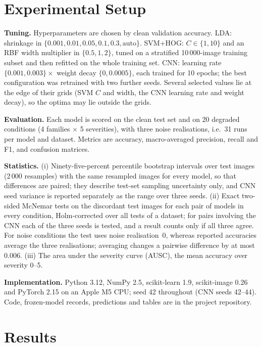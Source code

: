 \documentclass[conference]{IEEEtran}
\begin{document}
\section{Experimental Setup}
\textbf{Tuning.} Hyperparameters are chosen by clean validation accuracy. LDA: shrinkage in $\{0.001,0.01,0.05,0.1,0.3,\text{auto}\}$. SVM+HOG: $C\in\{1,10\}$ and an RBF width multiplier in $\{0.5,1,2\}$, tuned on a
stratified 10\,000-image training subset and then refitted on the whole training set. CNN: learning rate $\{0.001,0.003\}\times$ weight decay $\{0,0.0005\}$, each trained for 10 epochs; the best configuration was
retrained with two further seeds. Several selected values lie at the edge of their grids (SVM $C$ and width, the CNN learning rate and weight decay), so the optima may lie outside the grids.

\textbf{Evaluation.} Each model is scored on the clean test set and on 20 degraded conditions (4 families $\times$ 5 severities), with three noise realisations, i.e.\ 31 runs per model and dataset. Metrics are accuracy,
macro-averaged precision, recall and F1, and confusion matrices.

\textbf{Statistics.} (i) Ninety-five-percent percentile bootstrap intervals over test images (2\,000 resamples) with the same resampled images for every model, so that differences are paired; they describe test-set sampling
uncertainty only, and CNN seed variance is reported separately as the range over three seeds. (ii) Exact two-sided McNemar tests on the discordant test images for each pair of models in every condition, Holm-corrected over
all tests of a dataset; for pairs involving the CNN each of the three seeds is tested, and a result counts only if all three agree. For noise conditions the test uses noise realisation~0, whereas reported accuracies average the three realisations;
averaging changes a pairwise difference by at most 0.006. (iii) The area under the severity curve (AUSC), the mean accuracy over severity 0--5.

\textbf{Implementation.} Python 3.12, NumPy 2.5, scikit-learn 1.9, scikit-image 0.26 and PyTorch 2.15 on an Apple M5 CPU; seed 42 throughout (CNN seeds 42--44). Code, frozen-model records, predictions and tables are in the project repository.

\section{Results}
\end{document}
